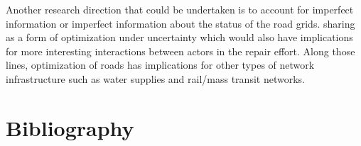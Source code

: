 \documentclass{article}
\begin{document}
	Another research direction that could be undertaken is to account for imperfect information or imperfect information about the status of the road grids. sharing as a form of optimization under uncertainty which would also have implications for more interesting interactions between actors in the repair effort. Along those lines, optimization of roads has implications for other types of network infrastructure such as water supplies and rail/mass transit networks.
	\section{Bibliography}
	
	
\end{document}
